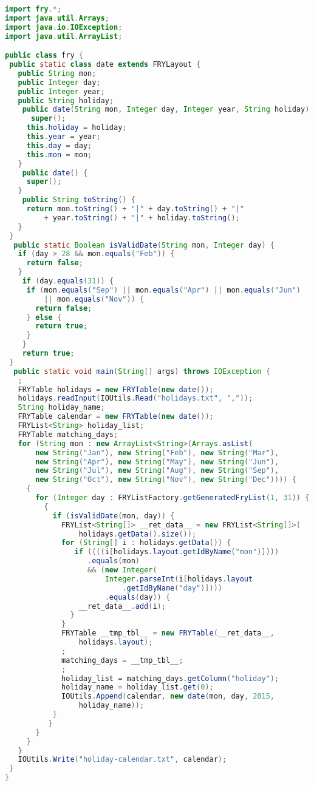 \documentclass{article}
\begin{document}
\begin{lstlisting}[language=Java,
basicstyle=\ttm,
commentstyle=\color{comment}\ttm,
otherkeywords={},             % Add keywords here
keywordstyle=\ttb\color{deepblue},
stringstyle=\color{deepgreen},
frame=tb,                         % Any extra options here
showstringspaces=false,            
breaklines=true]
import fry.*;
import java.util.Arrays;
import java.io.IOException;
import java.util.ArrayList;

public class fry {
 public static class date extends FRYLayout {
   public String mon;
   public Integer day;
   public Integer year;
   public String holiday;
    public date(String mon, Integer day, Integer year, String holiday) {
      super();
     this.holiday = holiday;
     this.year = year;
     this.day = day;
     this.mon = mon;
   }
    public date() {
     super();
   }
    public String toString() {
     return mon.toString() + "|" + day.toString() + "|"
         + year.toString() + "|" + holiday.toString();
   }
 }
  public static Boolean isValidDate(String mon, Integer day) {
   if (day > 28 && mon.equals("Feb")) {
     return false;
   }
    if (day.equals(31)) {
     if (mon.equals("Sep") || mon.equals("Apr") || mon.equals("Jun")
         || mon.equals("Nov")) {
       return false;
     } else {
       return true;
     }
    }
    return true;
 }
  public static void main(String[] args) throws IOException {
   ;
   FRYTable holidays = new FRYTable(new date());
   holidays.readInput(IOUtils.Read("holidays.txt", ","));
   String holiday_name;
   FRYTable calendar = new FRYTable(new date());
   FRYList<String> holiday_list;
   FRYTable matching_days;
   for (String mon : new ArrayList<String>(Arrays.asList(
       new String("Jan"), new String("Feb"), new String("Mar"),
       new String("Apr"), new String("May"), new String("Jun"),
       new String("Jul"), new String("Aug"), new String("Sep"),
       new String("Oct"), new String("Nov"), new String("Dec")))) {
     {
       for (Integer day : FRYListFactory.getGeneratedFryList(1, 31)) {
         {
           if (isValidDate(mon, day)) {
             FRYList<String[]> __ret_data__ = new FRYList<String[]>(
                 holidays.getData().size());
             for (String[] i : holidays.getData()) {
                if ((((i[holidays.layout.getIdByName("mon")])))
                   .equals(mon)
                   && (new Integer(
                       Integer.parseInt(i[holidays.layout
                           .getIdByName("day")])))
                       .equals(day)) {
                 __ret_data__.add(i);
               }
             }
             FRYTable __tmp_tbl__ = new FRYTable(__ret_data__,
                 holidays.layout);
             ;
             matching_days = __tmp_tbl__;
             ;
             holiday_list = matching_days.getColumn("holiday");
             holiday_name = holiday_list.get(0);
             IOUtils.Append(calendar, new date(mon, day, 2015,
                 holiday_name));
           }
          }
       }
     }
   }
   IOUtils.Write("holiday-calendar.txt", calendar);
 }
}
\end{lstlisting}
\end{document}
